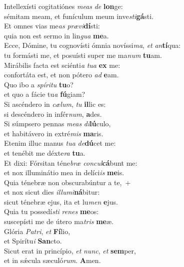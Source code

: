 \evenverse Intellexísti cogitatiónes \textit{me}\textit{as} \textit{de} \textbf{lon}ge:~\*\\
\evenverse sémitam meam, et funículum meum inve\textit{sti}\textbf{gá}sti.\\
\oddverse Et omnes vias me\textit{as} \textit{præ}\textit{vi}\textbf{dí}sti:~\*\\
\oddverse quia non est sermo in lin\textit{gua} \textbf{me}a.\\
\evenverse Ecce, Dómine, tu cognovísti ómnia novíssi\textit{ma}, \textit{et} \textit{an}\textbf{tí}qua:~\*\\
\evenverse tu formásti me, et posuísti super me ma\textit{num} \textbf{tu}am.\\
\oddverse Mirábilis facta est sciénti\textit{a} \textit{tu}\textit{a} \textbf{ex} me:~\*\\
\oddverse confortáta est, et non pótero \textit{ad} \textbf{e}am.\\
\evenverse Quo ibo a \textit{spí}\textit{ri}\textit{tu} \textbf{tu}o?~\*\\
\evenverse et quo a fácie tu\textit{a} \textbf{fú}giam?\\
\oddverse Si ascéndero in \textit{cæ}\textit{lum}, \textit{tu} \textbf{il}lic es:~\*\\
\oddverse si descéndero in infér\textit{num}, \textbf{a}des.\\
\evenverse Si súmpsero pennas \textit{me}\textit{as} \textit{di}\textbf{lú}culo,~\*\\
\evenverse et habitávero in extré\textit{mis} \textbf{ma}ris.\\
\oddverse Etenim illuc manus \textit{tu}\textit{a} \textit{de}\textbf{dú}cet me:~\*\\
\oddverse et tenébit me déxte\textit{ra} \textbf{tu}a.\\
\evenverse Et dixi: Fórsitan téne\textit{bræ} \textit{con}\textit{cul}\textbf{cá}bunt me:~\*\\
\evenverse et nox illuminátio mea in delíci\textit{is} \textbf{me}is.\\
\oddverse Quia ténebræ non obscurabúntur a te,~+\\
\oddverse  et nox sicut dies \textit{il}\textit{lu}\textit{mi}\textbf{ná}bitur:~\*\\
\oddverse sicut ténebræ ejus, ita et lu\textit{men} \textbf{e}jus.\\
\evenverse Quia tu possedí\textit{sti} \textit{re}\textit{nes} \textbf{me}os:~\*\\
\evenverse suscepísti me de útero ma\textit{tris} \textbf{me}æ.\\
\oddverse Glória \textit{Pa}\textit{tri}, \textit{et} \textbf{Fí}lio,~\*\\
\oddverse et Spirítu\textit{i} \textbf{San}cto.\\
\evenverse Sicut erat in princípio, \textit{et} \textit{nunc}, \textit{et} \textbf{sem}per,~\*\\
\evenverse et in sǽcula sæculó\textit{rum}. \textbf{A}men.\\
